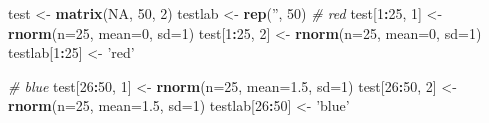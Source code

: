 \documentclass[]{article}
\newenvironment{Shaded}{\begin{snugshade}}{\end{snugshade}}
\newcommand{\CommentTok}[1]{\textcolor[rgb]{0.56,0.35,0.01}{\textit{#1}}}
\newcommand{\DataTypeTok}[1]{\textcolor[rgb]{0.13,0.29,0.53}{#1}}
\newcommand{\DecValTok}[1]{\textcolor[rgb]{0.00,0.00,0.81}{#1}}
\newcommand{\FloatTok}[1]{\textcolor[rgb]{0.00,0.00,0.81}{#1}}
\newcommand{\KeywordTok}[1]{\textcolor[rgb]{0.13,0.29,0.53}{\textbf{#1}}}
\newcommand{\NormalTok}[1]{#1}
\newcommand{\OperatorTok}[1]{\textcolor[rgb]{0.81,0.36,0.00}{\textbf{#1}}}
\newcommand{\OtherTok}[1]{\textcolor[rgb]{0.56,0.35,0.01}{#1}}
\newcommand{\StringTok}[1]{\textcolor[rgb]{0.31,0.60,0.02}{#1}}
\begin{document}
\begin{Shaded}
\begin{Highlighting}[]
\NormalTok{test <-}\StringTok{ }\KeywordTok{matrix}\NormalTok{(}\OtherTok{NA}\NormalTok{, }\DecValTok{50}\NormalTok{, }\DecValTok{2}\NormalTok{)}
\NormalTok{testlab <-}\StringTok{ }\KeywordTok{rep}\NormalTok{(}\StringTok{''}\NormalTok{, }\DecValTok{50}\NormalTok{)}
\CommentTok{# red}
\NormalTok{test[}\DecValTok{1}\OperatorTok{:}\DecValTok{25}\NormalTok{, }\DecValTok{1}\NormalTok{] <-}\StringTok{ }\KeywordTok{rnorm}\NormalTok{(}\DataTypeTok{n=}\DecValTok{25}\NormalTok{, }\DataTypeTok{mean=}\DecValTok{0}\NormalTok{, }\DataTypeTok{sd=}\DecValTok{1}\NormalTok{)}
\NormalTok{test[}\DecValTok{1}\OperatorTok{:}\DecValTok{25}\NormalTok{, }\DecValTok{2}\NormalTok{] <-}\StringTok{ }\KeywordTok{rnorm}\NormalTok{(}\DataTypeTok{n=}\DecValTok{25}\NormalTok{, }\DataTypeTok{mean=}\DecValTok{0}\NormalTok{, }\DataTypeTok{sd=}\DecValTok{1}\NormalTok{)}
\NormalTok{testlab[}\DecValTok{1}\OperatorTok{:}\DecValTok{25}\NormalTok{] <-}\StringTok{ 'red'}

\CommentTok{# blue}
\NormalTok{test[}\DecValTok{26}\OperatorTok{:}\DecValTok{50}\NormalTok{, }\DecValTok{1}\NormalTok{] <-}\StringTok{ }\KeywordTok{rnorm}\NormalTok{(}\DataTypeTok{n=}\DecValTok{25}\NormalTok{, }\DataTypeTok{mean=}\FloatTok{1.5}\NormalTok{, }\DataTypeTok{sd=}\DecValTok{1}\NormalTok{)}
\NormalTok{test[}\DecValTok{26}\OperatorTok{:}\DecValTok{50}\NormalTok{, }\DecValTok{2}\NormalTok{] <-}\StringTok{ }\KeywordTok{rnorm}\NormalTok{(}\DataTypeTok{n=}\DecValTok{25}\NormalTok{, }\DataTypeTok{mean=}\FloatTok{1.5}\NormalTok{, }\DataTypeTok{sd=}\DecValTok{1}\NormalTok{)}
\NormalTok{testlab[}\DecValTok{26}\OperatorTok{:}\DecValTok{50}\NormalTok{] <-}\StringTok{ 'blue'}


\end{Highlighting}
\end{Shaded}
\end{document}
